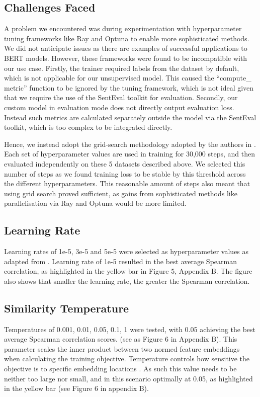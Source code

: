 \documentclass[10pt,twocolumn,letterpaper]{article}
\begin{document}
\subsection{Challenges Faced}

A problem we encountered was during experimentation with hyperparameter tuning frameworks like Ray and Optuna to enable more sophisticated methods. We did not anticipate issues as there are examples of successful applications to BERT models. However, these frameworks were found to be incompatible with our use case. Firstly, the trainer required labels from the dataset by default, which is not applicable for our unsupervised model. This caused the ``compute\_ metric'' function to be ignored by the tuning framework, which is not ideal given that we require the use of the SentEval toolkit for evaluation. Secondly, our custom model in evaluation mode does not directly output evaluation loss. Instead such metrics are calculated separately outside the model via the SentEval toolkit, which is too complex to be integrated directly.

Hence, we instead adopt the grid-search methodology adopted by the authors in \cite{2104.08821}. Each set of hyperparameter values are used in training for 30,000 steps, and then evaluated independently on these 5 datasets described above. We selected this number of steps as we found training loss to be stable by this threshold across the different hyperparameters. This reasonable amount of steps also meant that using grid search proved sufficient, as gains from sophisticated methods like parallelisation via Ray and Optuna would be more limited.


\subsection{Learning Rate}

Learning rates of 1e-5, 3e-5 and 5e-5 were selected as hyperparameter values as adapted from \cite{2104.08821}. Learning rate of 1e-5  resulted in the best average Spearman correlation, as highlighted in the yellow bar in Figure 5, Appendix B. The figure also shows that smaller the learning rate, the greater the Spearman correlation.

\subsection{Similarity Temperature}

Temperatures of 0.001, 0.01, 0.05, 0.1, 1 were tested, with 0.05 achieving the best average Spearman correlation scores. (see as Figure 6 in Appendix B). This parameter scales the inner product between two normed feature embeddings\cite{2112.01642} when calculating the training objective. Temperature controls how sensitive the objective is to specific embedding locations \cite{2110.04403}. As such this value needs to be neither too large nor small, and in this scenario optimally at 0.05, as highlighted in the yellow bar (see Figure 6 in appendix B).
\end{document}
